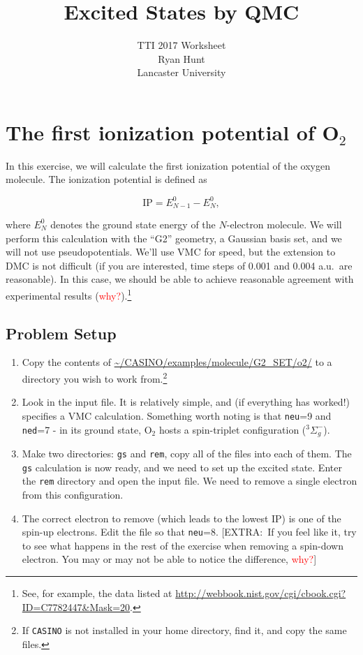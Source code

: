 \documentclass[12pt, a4paper]{article}
\title{Excited States by QMC}
\author{TTI 2017 Worksheet \\ Ryan Hunt \\ Lancaster University}
\begin{document}
\maketitle

\section{{The first ionization potential of O$_2$}}
In this exercise, we will calculate the first ionization potential of the
oxygen molecule. The ionization potential is defined as

\begin{equation}
  \text{IP} = E^{0}_{N-1} - E^{0}_{N},
\end{equation}

\noindent where $E^{0}_{N}$ denotes the ground state energy of the $N$-electron
molecule. We will perform this calculation with the ``G2'' geometry, a Gaussian
basis set, and we will not use pseudopotentials. We'll use VMC for speed, but
the extension to DMC is not difficult (if you are interested, time steps of
0.001 and 0.004 a.u.\ are reasonable). In this case, we should be able to
achieve reasonable agreement with experimental results
(\textcolor{red}{why?}).\footnote{See, for example, the data listed at
\url{http://webbook.nist.gov/cgi/cbook.cgi?ID=C7782447&Mask=20}.}

\subsection{Problem Setup}\label{sub:problem_setup}

\begin{enumerate}

  \item Copy the contents of \url{~/CASINO/examples/molecule/G2_SET/o2/} to a
  directory you wish to work from.\footnote{If \texttt{CASINO} is not installed
  in your home directory, find it, and copy the same files.}

  \item Look in the input file. It is relatively simple, and (if everything has
  worked!) specifies a VMC calculation. Something worth noting is that
  \texttt{neu}=9 and \texttt{ned}=7 - in its ground state, O$_2$ hosts a
  spin-triplet configuration ($^{3}\Sigma^{-}_{g}$).

  \item Make two directories: \texttt{gs} and \texttt{rem}, copy all of the
  files into each of them. The \texttt{gs} calculation is now ready, and we
  need to set up the excited state. Enter the \texttt{rem} directory and open
  the input file. We need to remove a single electron from this configuration.

  \item The correct electron to remove (which leads to the lowest IP) is one of
  the spin-up electrons. Edit the file so that \texttt{neu}=8. [EXTRA:\ If you
  feel like it, try to see what happens in the rest of the exercise when
  removing a spin-down electron. You may or may not be able to notice the
  difference, \textcolor{red}{why?}]

\end{enumerate}
\end{document}
